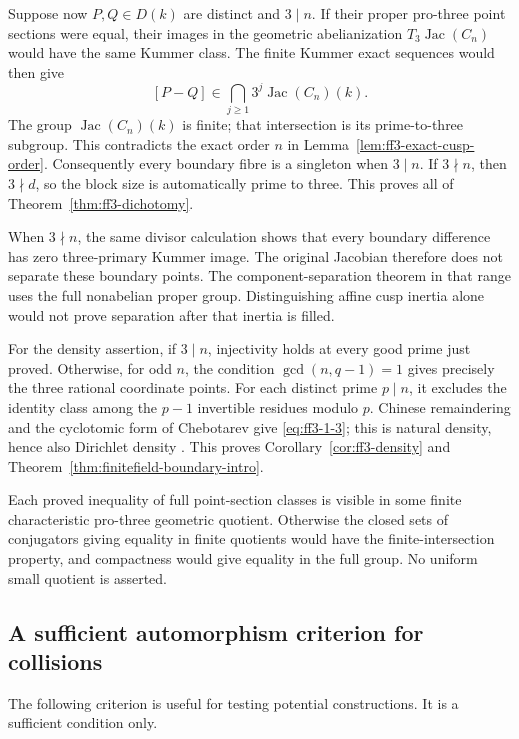 Suppose now \(P,Q\in D(k)\) are distinct and \(3\mid n\).
If their proper pro-three point sections were equal, their images
in the geometric abelianization \(T_3\operatorname{Jac}(C_n)\)
would have the same Kummer class. The finite Kummer exact sequences
would then give
\[
 [P-Q]\in\bigcap_{j\ge1}3^j\operatorname{Jac}(C_n)(k).
\]
The group \(\operatorname{Jac}(C_n)(k)\) is finite; that intersection
is its prime-to-three subgroup. This contradicts the exact order
\(n\) in Lemma~\ref{lem:ff3-exact-cusp-order}.
Consequently every boundary fibre is a singleton when \(3\mid n\).
If \(3\nmid n\), then \(3\nmid d\), so the block size is automatically
prime to three. This proves all of Theorem~\ref{thm:ff3-dichotomy}.

When \(3\nmid n\), the same divisor calculation shows that every
boundary difference has zero three-primary Kummer image. The
original Jacobian therefore does not separate these boundary points.
The component-separation theorem in that range uses the full
nonabelian proper group. Distinguishing affine cusp inertia alone
would not prove separation after that inertia is filled.

For the density assertion, if \(3\mid n\), injectivity holds at every
good prime just proved. Otherwise, for odd \(n\), the condition
\(\gcd(n,q-1)=1\) gives precisely the three rational coordinate
points. For each distinct prime \(p\mid n\), it excludes the identity
class among the \(p-1\) invertible residues modulo \(p\).
Chinese remaindering and the cyclotomic form of Chebotarev give
\eqref{eq:ff3-1-3}; this is natural density, hence also Dirichlet density
\citep[Definition~8.30, Theorem~8.31, and Example~8.34,
pp.~147--148]{Milne2020ANT}.
This proves Corollary~\ref{cor:ff3-density} and
Theorem~\ref{thm:finitefield-boundary-intro}.

Each proved inequality of full point-section classes is visible in
some finite characteristic pro-three geometric quotient. Otherwise
the closed sets of conjugators giving equality in finite quotients
would have the finite-intersection property, and compactness would
give equality in the full group. No uniform small quotient is asserted.

\subsection{A sufficient automorphism criterion for collisions}
\label{subsec:ff3-automorphisms}

The following criterion is useful for testing potential constructions. It is a sufficient condition only.

